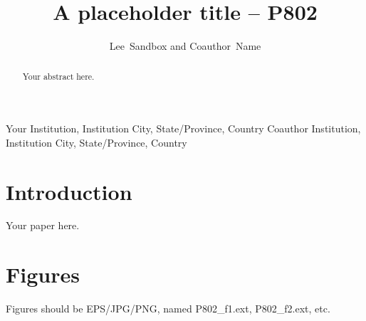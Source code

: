 \documentclass[11pt,twoside]{article}
\begin{document}
\title{A placeholder title -- P802}

\author{Lee~Sandbox and Coauthor~Name}
Your Institution, Institution City, State/Province, Country
Coauthor Institution, Institution City, State/Province, Country



\begin{abstract}
Your abstract here.
\end{abstract}

\section{Introduction}

Your paper here.

\section{Figures}

Figures should be EPS/JPG/PNG, named P802\_f1.ext, P802\_f2.ext, etc.

% 
\end{document}
